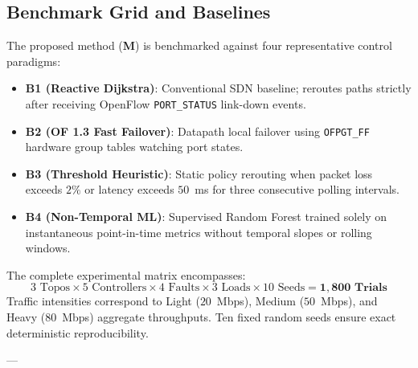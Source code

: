 \documentclass[10pt,twocolumn]{article}
\begin{document}
\subsection{Benchmark Grid and Baselines}
The proposed method (\textbf{M}) is benchmarked against four representative control paradigms:
\begin{itemize}
    \item \textbf{B1 (Reactive Dijkstra)}: Conventional SDN baseline; reroutes paths strictly after receiving OpenFlow \texttt{PORT\_STATUS} link-down events.
    \item \textbf{B2 (OF 1.3 Fast Failover)}: Datapath local failover using \texttt{OFPGT\_FF} hardware group tables watching port states.
    \item \textbf{B3 (Threshold Heuristic)}: Static policy rerouting when packet loss exceeds $2\%$ or latency exceeds $50$~ms for three consecutive polling intervals.
    \item \textbf{B4 (Non-Temporal ML)}: Supervised Random Forest trained solely on instantaneous point-in-time metrics without temporal slopes or rolling windows.
\end{itemize}

The complete experimental matrix encompasses:
$$\text{3 Topos} \times \text{5 Controllers} \times \text{4 Faults} \times \text{3 Loads} \times \text{10 Seeds} = \mathbf{1{,}800 \text{ Trials}}$$
Traffic intensities correspond to Light ($20$~Mbps), Medium ($50$~Mbps), and Heavy ($80$~Mbps) aggregate throughputs. Ten fixed random seeds ensure exact deterministic reproducibility.

---
\end{document}
